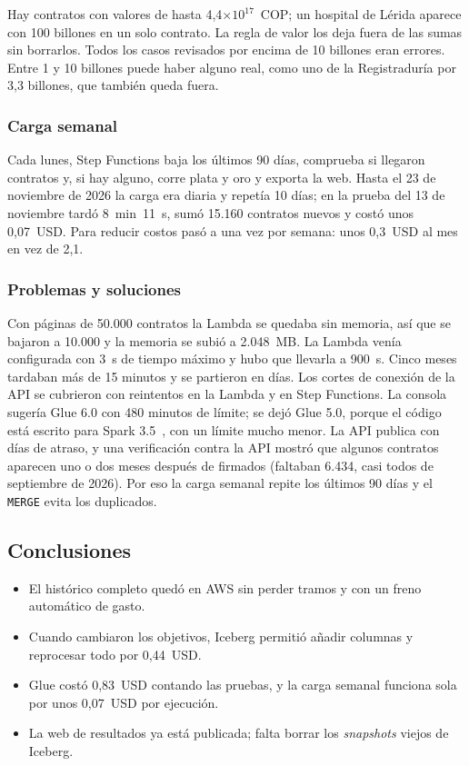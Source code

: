 Hay contratos con valores de hasta 4,4$\times 10^{17}$~COP; un hospital de Lérida aparece con 100 billones en un solo contrato. La regla de valor los deja fuera de las sumas sin borrarlos. Todos los casos revisados por encima de 10 billones eran errores. Entre 1 y 10 billones puede haber alguno real, como uno de la Registraduría por 3,3 billones, que también queda fuera.

\subsubsection{Carga semanal}
Cada lunes, Step Functions baja los últimos 90 días, comprueba si llegaron contratos y, si hay alguno, corre plata y oro y exporta la web. Hasta el 23 de noviembre de 2026 la carga era diaria y repetía 10 días; en la prueba del 13 de noviembre tardó 8~min~11~s, sumó 15.160 contratos nuevos y costó unos 0,07~USD. Para reducir costos pasó a una vez por semana: unos 0,3~USD al mes en vez de 2,1.

\subsubsection{Problemas y soluciones}
Con páginas de 50.000 contratos la Lambda se quedaba sin memoria, así que se bajaron a 10.000 y la memoria se subió a 2.048~MB. La Lambda venía configurada con 3~s de tiempo máximo y hubo que llevarla a 900~s. Cinco meses tardaban más de 15 minutos y se partieron en días. Los cortes de conexión de la API se cubrieron con reintentos en la Lambda y en Step Functions. La consola sugería Glue 6.0 con 480 minutos de límite; se dejó Glue 5.0, porque el código está escrito para Spark 3.5~\cite{aws_glue_versions}, con un límite mucho menor. La API publica con días de atraso, y una verificación contra la API mostró que algunos contratos aparecen uno o dos meses después de firmados (faltaban 6.434, casi todos de septiembre de 2026). Por eso la carga semanal repite los últimos 90 días y el \texttt{MERGE} evita los duplicados.

\subsection{Conclusiones}\label{cloud:sec:conclusiones}
\begin{itemize}
  \item El histórico completo quedó en AWS sin perder tramos y con un freno automático de gasto.
  \item Cuando cambiaron los objetivos, Iceberg permitió añadir columnas y reprocesar todo por 0,44~USD.
  \item Glue costó 0,83~USD contando las pruebas, y la carga semanal funciona sola por unos 0,07~USD por ejecución.
  \item La web de resultados ya está publicada; falta borrar los \emph{snapshots} viejos de Iceberg.
\end{itemize}

